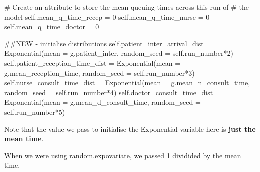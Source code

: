 \documentclass[
  letterpaper,
  DIV=11,
  numbers=noendperiod]{scrreprt}
\newenvironment{Shaded}{}{}
\newcommand{\CommentTok}[1]{\textcolor[rgb]{0.42,0.45,0.49}{#1}}
\newcommand{\DecValTok}[1]{\textcolor[rgb]{0.00,0.36,0.77}{#1}}
\newcommand{\NormalTok}[1]{\textcolor[rgb]{0.14,0.16,0.18}{#1}}
\newcommand{\OperatorTok}[1]{\textcolor[rgb]{0.14,0.16,0.18}{#1}}
\newcommand{\VariableTok}[1]{\textcolor[rgb]{0.89,0.38,0.04}{#1}}
\begin{document}
\begin{Shaded}
\begin{Highlighting}[]
        \CommentTok{\# Create an attribute to store the mean queuing times across this run of}
        \CommentTok{\# the model}
        \VariableTok{self}\NormalTok{.mean\_q\_time\_recep }\OperatorTok{=} \DecValTok{0}
        \VariableTok{self}\NormalTok{.mean\_q\_time\_nurse }\OperatorTok{=} \DecValTok{0}
        \VariableTok{self}\NormalTok{.mean\_q\_time\_doctor }\OperatorTok{=} \DecValTok{0}

        \CommentTok{\#\#NEW {-} initialise distributions}
        \VariableTok{self}\NormalTok{.patient\_inter\_arrival\_dist }\OperatorTok{=}\NormalTok{ Exponential(mean }\OperatorTok{=}\NormalTok{ g.patient\_inter, random\_seed }\OperatorTok{=} \VariableTok{self}\NormalTok{.run\_number}\OperatorTok{*}\DecValTok{2}\NormalTok{)}
        \VariableTok{self}\NormalTok{.patient\_reception\_time\_dist }\OperatorTok{=}\NormalTok{ Exponential(mean }\OperatorTok{=}\NormalTok{ g.mean\_reception\_time, random\_seed }\OperatorTok{=} \VariableTok{self}\NormalTok{.run\_number}\OperatorTok{*}\DecValTok{3}\NormalTok{)}
        \VariableTok{self}\NormalTok{.nurse\_consult\_time\_dist }\OperatorTok{=}\NormalTok{ Exponential(mean }\OperatorTok{=}\NormalTok{ g.mean\_n\_consult\_time, random\_seed }\OperatorTok{=} \VariableTok{self}\NormalTok{.run\_number}\OperatorTok{*}\DecValTok{4}\NormalTok{)}
        \VariableTok{self}\NormalTok{.doctor\_consult\_time\_dist }\OperatorTok{=}\NormalTok{ Exponential(mean }\OperatorTok{=}\NormalTok{ g.mean\_d\_consult\_time, random\_seed }\OperatorTok{=} \VariableTok{self}\NormalTok{.run\_number}\OperatorTok{*}\DecValTok{5}\NormalTok{)}
\end{Highlighting}
\end{Shaded}

\begin{tcolorbox}[enhanced jigsaw, colframe=quarto-callout-warning-color-frame, bottomtitle=1mm, breakable, rightrule=.15mm, coltitle=black, colbacktitle=quarto-callout-warning-color!10!white, opacityback=0, leftrule=.75mm, arc=.35mm, toptitle=1mm, title=\textcolor{quarto-callout-warning-color}{\faExclamationTriangle}\hspace{0.5em}{Warning}, titlerule=0mm, colback=white, toprule=.15mm, bottomrule=.15mm, left=2mm, opacitybacktitle=0.6]

Note that the value we pass to initialise the Exponential variable here
is \textbf{just the mean time}.

When we were using random.expovariate, we passed 1 dividided by the mean
time.

\end{tcolorbox}
\end{document}
